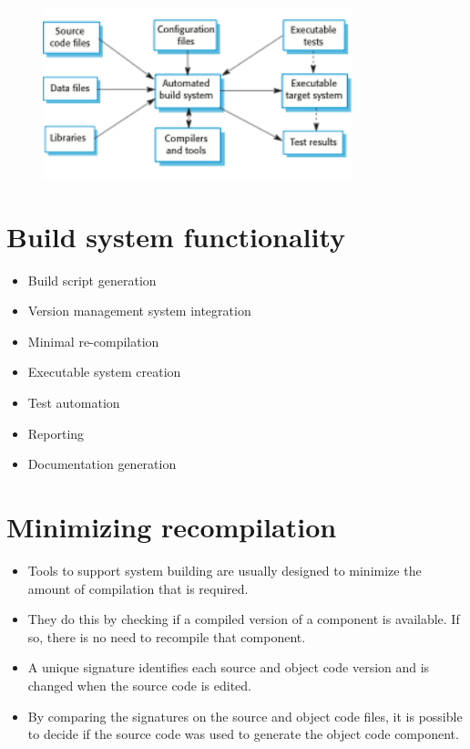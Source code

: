 \begin{figure}[h!]
    \centering
    \includegraphics[width = 0.8\textwidth]{./figures/L8_8.png}
    \caption{}
    \label{fig:L8_8}
\end{figure}



\section{Build system functionality}
\begin{itemize}

\item Build script generation

\item Version management system integration

\item Minimal re-compilation

\item Executable system creation

\item Test automation

\item Reporting

\item Documentation generation

\end{itemize}
\section{Minimizing recompilation}
\begin{itemize}
\item Tools to support system building are usually designed to minimize the amount of compilation that is required.

\item They do this by checking if a compiled version of a component is available. If so, there is no need to recompile that component.

\item A unique signature identifies each source and object code version and is changed when the source code is edited.

\item By comparing the signatures on the source and object code files, it is possible to decide if the source code was used to generate the object code component.
\end{itemize}
